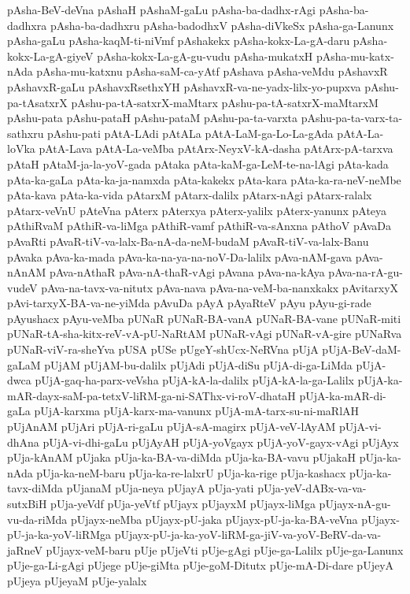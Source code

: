 {pAsha-BeV-deVna
pAshaH
pAshaM-gaLu
pAsha-ba-dadhx-rAgi
pAsha-ba-dadhxra
pAsha-ba-dadhxru
pAsha-badodhxV
pAsha-diVkeSx
pAsha-ga-Lanunx
pAsha-gaLu
pAsha-kaqM-ti-niVmf
pAshakekx
pAsha-kokx-La-gA-daru
pAsha-kokx-La-gA-giyeV
pAsha-kokx-La-gA-gu-vudu
pAsha-mukatxH
pAsha-mu-katx-nAda
pAsha-mu-katxnu
pAsha-saM-ca-yAtf
pAshava
pAsha-veMdu
pAshavxR
pAshavxR-gaLu
pAshavxRsethxYH
pAshavxR-va-ne-yadx-lilx-yo-pupxva
pAshu-pa-tAsatxrX
pAshu-pa-tA-satxrX-maMtarx
pAshu-pa-tA-satxrX-maMtarxM
pAshu-pata
pAshu-pataH
pAshu-pataM
pAshu-pa-ta-varxta
pAshu-pa-ta-varx-ta-sathxru
pAshu-pati
pAtA-LAdi
pAtALa
pAtA-LaM-ga-Lo-La-gAda
pAtA-La-loVka
pAtA-Lava
pAtA-La-veMba
pAtArx-NeyxV-kA-dasha
pAtArx-pA-tarxva
pAtaH
pAtaM-ja-la-yoV-gada
pAtaka
pAta-kaM-ga-LeM-te-na-lAgi
pAta-kada
pAta-ka-gaLa
pAta-ka-ja-namxda
pAta-kakekx
pAta-kara
pAta-ka-ra-neV-neMbe
pAta-kava
pAta-ka-vida
pAtarxM
pAtarx-dalilx
pAtarx-nAgi
pAtarx-ralalx
pAtarx-veVnU
pAteVna
pAterx
pAterxya
pAterx-yalilx
pAterx-yanunx
pAteya
pAthiRvaM
pAthiR-va-liMga
pAthiR-vamf
pAthiR-va-sAnxna
pAthoV
pAvaDa
pAvaRti
pAvaR-tiV-va-lalx-Ba-nA-da-neM-budaM
pAvaR-tiV-va-lalx-Banu
pAvaka
pAva-ka-mada
pAva-ka-na-ya-na-noV-Da-lalilx
pAva-nAM-gava
pAva-nAnAM
pAva-nAthaR
pAva-nA-thaR-vAgi
pAvana
pAva-na-kAya
pAva-na-rA-gu-vudeV
pAva-na-tavx-va-nitutx
pAva-nava
pAva-na-veM-ba-nanxkakx
pAvitarxyX
pAvi-tarxyX-BA-va-ne-yiMda
pAvuDa
pAyA
pAyaRteV
pAyu
pAyu-gi-rade
pAyushacx
pAyu-veMba
pUNaR
pUNaR-BA-vanA
pUNaR-BA-vane
pUNaR-miti
pUNaR-tA-sha-kitx-reV-vA-pU-NaRtAM
pUNaR-vAgi
pUNaR-vA-gire
pUNaRva
pUNaR-viV-ra-sheYva
pUSA
pUSe
pUgeY-shUcx-NeRVna
pUjA
pUjA-BeV-daM-gaLaM
pUjAM
pUjAM-bu-dalilx
pUjAdi
pUjA-diSu
pUjA-di-ga-LiMda
pUjA-dwca
pUjA-gaq-ha-parx-veVsha
pUjA-kA-la-dalilx
pUjA-kA-la-ga-Lalilx
pUjA-ka-mAR-dayx-saM-pa-tetxV-liRM-ga-ni-SAThx-vi-roV-dhataH
pUjA-ka-mAR-di-gaLa
pUjA-karxma
pUjA-karx-ma-vanunx
pUjA-mA-tarx-su-ni-maRlAH
pUjAnAM
pUjAri
pUjA-ri-gaLu
pUjA-sA-magirx
pUjA-veV-lAyAM
pUjA-vi-dhAna
pUjA-vi-dhi-gaLu
pUjAyAH
pUjA-yoVgayx
pUjA-yoV-gayx-vAgi
pUjAyx
pUja-kAnAM
pUjaka
pUja-ka-BA-va-diMda
pUja-ka-BA-vavu
pUjakaH
pUja-ka-nAda
pUja-ka-neM-baru
pUja-ka-re-lalxrU
pUja-ka-rige
pUja-kashacx
pUja-ka-tavx-diMda
pUjanaM
pUja-neya
pUjayA
pUja-yati
pUja-yeV-dABx-va-va-sutxBiH
pUja-yeVdf
pUja-yeVtf
pUjayx
pUjayxM
pUjayx-liMga
pUjayx-nA-gu-vu-da-riMda
pUjayx-neMba
pUjayx-pU-jaka
pUjayx-pU-ja-ka-BA-veVna
pUjayx-pU-ja-ka-yoV-liRMga
pUjayx-pU-ja-ka-yoV-liRM-ga-jiV-va-yoV-BeRV-da-va-jaRneV
pUjayx-veM-baru
pUje
pUjeVti
pUje-gAgi
pUje-ga-Lalilx
pUje-ga-Lanunx
pUje-ga-Li-gAgi
pUjege
pUje-giMta
pUje-goM-Ditutx
pUje-mA-Di-dare
pUjeyA
pUjeya
pUjeyaM
pUje-yalalx
}
